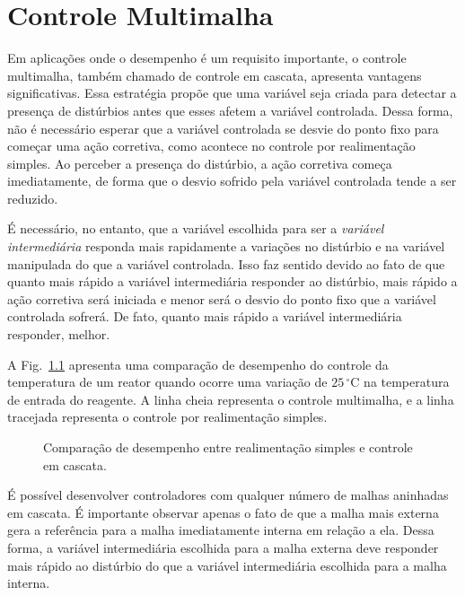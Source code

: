 
\chapter{Controle Multimalha}\label{controle}

	Em aplicações onde o desempenho é um requisito importante, o controle multimalha, também chamado de controle em cascata, apresenta vantagens significativas. Essa estratégia propõe que uma variável seja criada para detectar a presença de distúrbios antes que esses afetem a variável controlada. Dessa forma, não é necessário esperar que a variável controlada se desvie do ponto fixo para começar uma ação corretiva, como acontece no controle por realimentação simples. Ao perceber a presença do distúrbio, a ação corretiva começa imediatamente, de forma que o desvio sofrido pela variável controlada tende a ser reduzido.

    É necessário, no entanto, que a variável escolhida para ser a \emph{variável intermediária} responda mais rapidamente a variações no distúrbio e na variável manipulada do que a variável controlada. Isso faz sentido devido ao fato de que quanto mais rápido a variável intermediária responder ao distúrbio, mais rápido a ação corretiva será iniciada e menor será o desvio do ponto fixo que a variável controlada sofrerá. De fato, quanto mais rápido a variável intermediária responder, melhor.

    A Fig.~\ref{fig:realimentacao_vs_cascata} apresenta uma comparação de desempenho do controle da temperatura de um reator quando ocorre uma variação de $25\,^{\circ}\mathrm{C}$ na temperatura de entrada do reagente. A linha cheia representa o controle multimalha, e a linha tracejada representa o controle por realimentação simples.

    \begin{figure}[htb]
        \renewcommand\figurename{Fig.}
        \caption{Comparação de desempenho entre realimentação simples e controle em cascata.}
        \label{fig:realimentacao_vs_cascata}
    \end{figure}

    É possível desenvolver controladores com qualquer número de malhas aninhadas em cascata. É importante observar apenas o fato de que a malha mais externa gera a referência para a malha imediatamente interna em relação a ela. Dessa forma, a variável intermediária escolhida para a malha externa deve responder mais rápido ao distúrbio do que a variável intermediária escolhida para a malha interna.

